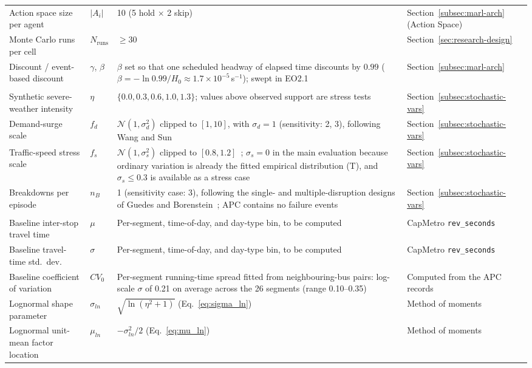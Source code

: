\begin{table}[htbp]
\begin{tabularx}{\textwidth}{
>{\RaggedRight\arraybackslash}p{}
>{\RaggedRight\arraybackslash}p{}
X
>{\RaggedRight\arraybackslash}p{}
}
Action space size per agent & $|A_i|$ & 10 (5 hold $\times$ 2 skip) & Section~\ref{subsec:marl-arch} (Action Space) \\
Monte Carlo runs per cell & $N_{\text{runs}}$ & $\geq 30$ & Section~\ref{sec:research-design} \\
Discount / event-based discount & $\gamma$, $\beta$ & $\beta$ set so that one scheduled headway of elapsed time discounts by $0.99$ ($\beta = -\ln 0.99 / H_0 \approx 1.7\times10^{-5}$\,s$^{-1}$); swept in EO2.1 & Section~\ref{subsec:marl-arch} \\

\midrule
\multicolumn{4}{l}{\textit{Swept / variable parameters}} \\
\midrule

Synthetic severe-weather intensity & $\eta$ & $\{0.0, 0.3, 0.6, 1.0, 1.3\}$; values above observed support are stress tests & Section~\ref{subsec:stochastic-vars} \\
Demand-surge scale & $f_d$ & $\mathcal{N}(1,\sigma_d^2)$ clipped to $[1,10]$, with $\sigma_d = 1$ (sensitivity: 2, 3), following Wang and Sun~\cite{Wangsun} & Section~\ref{subsec:stochastic-vars} \\
Traffic-speed stress scale & $f_s$ & $\mathcal{N}(1,\sigma_s^2)$ clipped to $[0.8,1.2]$~\cite{Wangsun}; $\sigma_s = 0$ in the main evaluation because ordinary variation is already the fitted empirical distribution (T), and $\sigma_s \le 0.3$ is available as a stress case & Section~\ref{subsec:stochastic-vars} \\
Breakdowns per episode & $n_B$ & 1 (sensitivity case: 3), following the single- and multiple-disruption designs of Guedes and Borenstein~\cite{Guedes2018Rescheduling}; APC contains no failure events & Section~\ref{subsec:stochastic-vars} \\

\midrule
\multicolumn{4}{l}{\textit{Derived empirical/calibration parameters}} \\
\midrule

Baseline inter-stop travel time & $\mu$ & Per-segment, time-of-day, and day-type bin, to be computed & CapMetro \texttt{rev\_seconds} \\
Baseline travel-time std.\ dev.\ & $\sigma$ & Per-segment, time-of-day, and day-type bin, to be computed & CapMetro \texttt{rev\_seconds} \\
Baseline coefficient of variation & $CV_0$ & Per-segment running-time spread fitted from neighbouring-bus pairs: log-scale $\sigma$ of 0.21 on average across the 26 segments (range 0.10--0.35) & Computed from the APC records \\
Lognormal shape parameter & $\sigma_{ln}$ & $\sqrt{\ln(\eta^2+1)}$ (Eq.~\ref{eq:sigma_ln}) & Method of moments \\
Lognormal unit-mean factor location & $\mu_{ln}$ & $-\sigma_{ln}^2/2$ (Eq.~\ref{eq:mu_ln}) & Method of moments \\


\end{tabularx}
\end{table}
